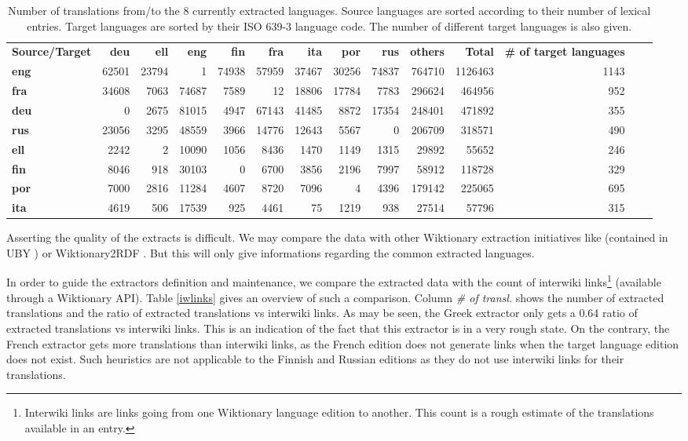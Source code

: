 \documentclass[sw]{iosart2c}
\begin{document}
\begin{table}[htb]
\begin{tabular}{lrrrrrrrrrrrrr}
\textbf{Source/Target}  & \textbf{deu} & \textbf{ell} & \textbf{eng} & \textbf{fin} & \textbf{fra} & \textbf{ita} & \textbf{por} & \textbf{rus}& \textbf{others} & \textbf{Total} & \textbf{\# of target languages}\\
\textbf{eng} & 62501 & 23794 & 1 & 74938 & 57959 & 37467 & 30256 & 74837 & 764710 & 1126463 & 1143\\
\textbf{fra} & 34608 & 7063 & 74687 & 7589 & 12 & 18806 & 17784 & 7783 & 296624 & 464956 & 952\\
\textbf{deu} & 0 & 2675 & 81015 & 4947 & 67143 & 41485 & 8872 & 17354 & 248401 & 471892 & 355\\
\textbf{rus} & 23056 & 3295 & 48559 & 3966 & 14776 & 12643 & 5567 & 0 & 206709 & 318571 & 490\\
\textbf{ell} & 2242 & 2 & 10090 & 1056 & 8436 & 1470 & 1149 & 1315 & 29892 & 55652 & 246\\
\textbf{fin} & 8046 & 918 & 30103 & 0 & 6700 & 3856 & 2196 & 7997 & 58912 & 118728 & 329\\
\textbf{por} & 7000 & 2816 & 11284 & 4607 & 8720 & 7096 & 4 & 4396 & 179142 & 225065 & 695\\
\textbf{ita} & 4619 & 506 & 17539 & 925 & 4461 & 75 & 1219 & 938 & 27514 & 57796 & 315\\
\end{tabular}
\caption{Number of translations from/to the 8 currently extracted languages. Source languages are sorted according to their number of lexical entries. Target languages are sorted by their ISO 639-3 language code. The number of different target languages is also given.}\label{tradsize}
\end{table}

Asserting the quality of the extracts is difficult. We may compare the data with other Wiktionary extraction initiatives like \cite{Zesch08Wikipedia} (contained in UBY \cite{UBY:TUD-CS-2012-0023}) or Wiktionary2RDF \cite{DBLP:conf/aswc/HellmannBA12}. But this will only give informations regarding the common extracted languages. 

In order to guide the extractors definition and maintenance, we compare the extracted data with the count of interwiki links\footnote{Interwiki links are links going from one Wiktionary language edition to another. This count is a rough estimate of the translations available in an entry.} (available through a Wiktionary API). Table \ref{iwlinks} gives an overview of such a comparison. Column \textit{\# of transl.} shows the number of extracted translations and the ratio of extracted translations vs interwiki links. As may be seen, the Greek extractor only gets a 0.64 ratio of extracted translations vs interwiki links. This is an indication of the fact that this extractor is in a very rough state. On the contrary, the French extractor gets more translations than interwiki links, as the French edition does not generate links when the target language edition does not exist. Such heuristics are not applicable to the Finnish and Russian editions as they do not use interwiki links for their translations.
\end{document}
